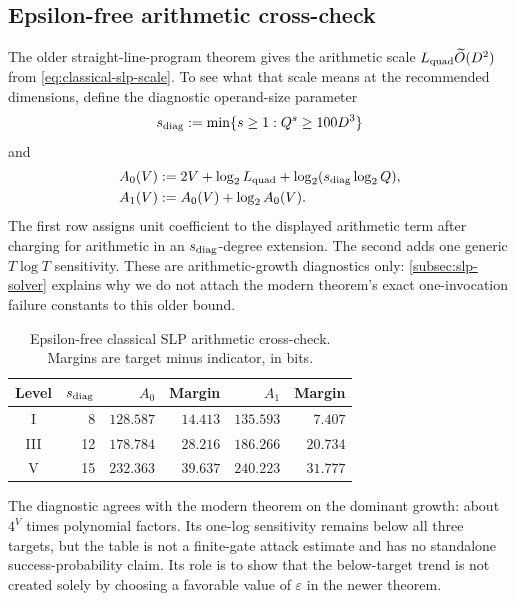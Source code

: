 \documentclass[11pt,a4paper]{article}
\theoremstyle{definition}
\theoremstyle{remark}
\begin{document}
\subsection{Epsilon-free arithmetic cross-check}\label{subsec:slp-cost}

The older straight-line-program theorem gives the arithmetic scale
$L_{\rm quad}\widetilde O(D^2)$ from \eqref{eq:classical-slp-scale}.  To see what that scale means at the recommended dimensions, define the diagnostic operand-size parameter
\[
 s_{\rm diag}:=\min\{s\ge1:Q^s\ge100D^3\}
\]
and
\begin{align}
 A_0(V)&:=2V+\log_2L_{\rm quad}+\log_2(s_{\rm diag}\log_2Q),\label{eq:slp-direct-indicator}\\
 A_1(V)&:=A_0(V)+\log_2A_0(V).\label{eq:slp-stress-indicators}
\end{align}
The first row assigns unit coefficient to the displayed arithmetic term after charging for arithmetic in an $s_{\rm diag}$-degree extension.  The second adds one generic $T\log T$ sensitivity.  These are arithmetic-growth diagnostics only: \cref{subsec:slp-solver} explains why we do not attach the modern theorem's exact one-invocation failure constants to this older bound.

\begin{table}[t]
\centering
\small
\caption{Epsilon-free classical SLP arithmetic cross-check.  Margins are target minus indicator, in bits.}
\label{tab:slp-costs}
\setlength{\tabcolsep}{5pt}
\begin{tabular}{@{}c r r r r r@{}}
\toprule
Level & $s_{\rm diag}$ & $A_0$ & Margin & $A_1$ & Margin \\
\midrule
I   & 8  & $128.587$ & $14.413$ & $135.593$ & $7.407$ \\
III & 12 & $178.784$ & $28.216$ & $186.266$ & $20.734$ \\
V   & 15 & $232.363$ & $39.637$ & $240.223$ & $31.777$ \\
\bottomrule
\end{tabular}
\end{table}

The diagnostic agrees with the modern theorem on the dominant growth: about $4^V$ times polynomial factors.  Its one-log sensitivity remains below all three targets, but the table is not a finite-gate attack estimate and has no standalone success-probability claim.  Its role is to show that the below-target trend is not created solely by choosing a favorable value of $\varepsilon$ in the newer theorem.
\end{document}
